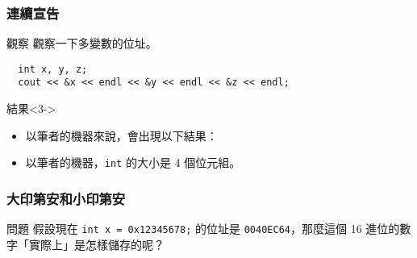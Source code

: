 \documentclass[utf8]{beamer}
\begin{document}
\begin{CJK}{UTF8}{bkai}
\begin{frame}[fragile]
  \frametitle{連續宣告}
  \begin{block}{觀察}
  觀察一下多變數的位址。
  \pause
  \begin{lstlisting}
  int x, y, z;
  cout << &x << endl << &y << endl << &z << endl;
  \end{lstlisting}
  \end{block}
  \begin{exampleblock}{結果}<3->
    \begin{itemize}
    \item 以筆者的機器來說，會出現以下結果：
    \item<6-> 以筆者的機器，\lstinline{int}{} 的大小是 \alert{4} 個位元組。
    \end{itemize}
  \end{exampleblock}
\end{frame}

\begin{frame}[fragile]
  \frametitle{大印第安和小印第安}
  \begin{block}{問題}
  假設現在 \lstinline{int x = 0x12345678;}{} 的位址是 \texttt{0040EC64}，那麼這個 16 進位的數字「實際上」是怎樣儲存的呢？
  \end{block}
\end{frame}


\end{CJK}
\end{document}
